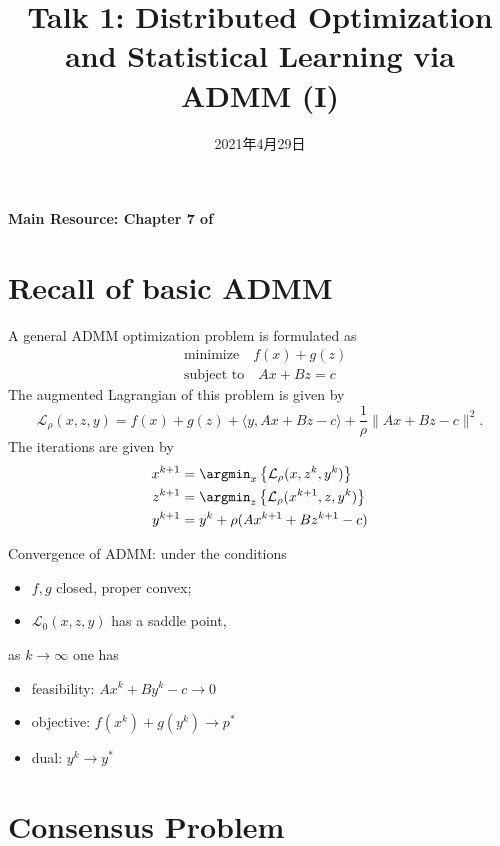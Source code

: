 
\usepackage{empheq}
\usepackage{cancel}



\title{Talk 1: Distributed Optimization and Statistical Learning via ADMM (I)}
\date{2021年4月29日}
\author{}

\maketitle

{\bfseries Main Resource: Chapter 7 of \cite{boyd2011distributed}}

\section{Recall of basic ADMM}

A general ADMM optimization problem is formulated as
\begin{align*}
    & \text{minimize} \quad f(x) + g(z) \\
    & \text{subject to} \quad Ax + Bz = c
\end{align*}
The augmented Lagrangian of this problem is given by
$$\mathcal{L}_{\rho}(x,z,y) = f(x) + g(z) + \langle y, Ax+Bz-c \rangle + \dfrac{1}{\rho}\lVert Ax+Bz-c \rVert^2.$$
The iterations are given by
\begin{align*}
    x^{k+1} & = \argmin_{x} \left\{ \mathcal{L}_{\rho}(x,z^k,y^k) \right\} \\
    z^{k+1} & = \argmin_{z} \left\{ \mathcal{L}_{\rho}(x^{k+1},z,y^k) \right\} \\
    y^{k+1} & = y^{k} + \rho (Ax^{k+1}+Bz^{k+1}-c)
\end{align*}

Convergence of ADMM: under the conditions
\begin{itemize}
    \item $f,g$ closed, proper convex;
    \item $\mathcal{L}_{0}(x,z,y)$ has a saddle point,
\end{itemize}
as $k\rightarrow\infty$ one has
\begin{itemize}
    \item feasibility: $Ax^k + By^k - c \rightarrow 0$
    \item objective: $f(x^k) + g(y^k) \rightarrow p^*$
    \item dual: $y^k \rightarrow y^*$
\end{itemize}

\section{Consensus Problem}

